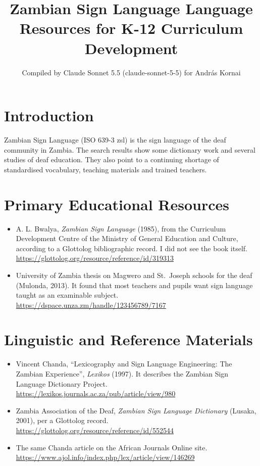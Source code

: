 \documentclass[12pt]{article}
\title{Zambian Sign Language Language Resources for K-12 Curriculum Development}
\author{Compiled by Claude Sonnet 5.5 (claude-sonnet-5-5) for Andr\'as Kornai}
\date{}
\begin{document}
\maketitle

\section{Introduction}
Zambian Sign Language (ISO 639-3 zsl) is the sign language of the deaf community in Zambia. The search results show some dictionary work and several studies of deaf education. They also point to a continuing shortage of standardised vocabulary, teaching materials and trained teachers.

\section{Primary Educational Resources}
\begin{itemize}
\item A. L. Bwalya, \emph{Zambian Sign Language} (1985), from the Curriculum Development Centre of the Ministry of General Education and Culture, according to a Glottolog bibliographic record. I did not see the book itself. \url{https://glottolog.org/resource/reference/id/319313}
\item University of Zambia thesis on Magwero and St.\ Joseph schools for the deaf (Mulonda, 2013). It found that most teachers and pupils want sign language taught as an examinable subject. \url{https://dspace.unza.zm/handle/123456789/7167}
\end{itemize}

\section{Linguistic and Reference Materials}
\begin{itemize}
\item Vincent Chanda, ``Lexicography and Sign Language Engineering: The Zambian Experience'', \emph{Lexikos} (1997). It describes the Zambian Sign Language Dictionary Project. \url{https://lexikos.journals.ac.za/pub/article/view/980}
\item Zambia Association of the Deaf, \emph{Zambian Sign Language Dictionary} (Lusaka, 2001), per a Glottolog record. \url{https://glottolog.org/resource/reference/id/552544}
\item The same Chanda article on the African Journals Online site. \url{https://www.ajol.info/index.php/lex/article/view/146269}
\end{itemize}
\end{document}
